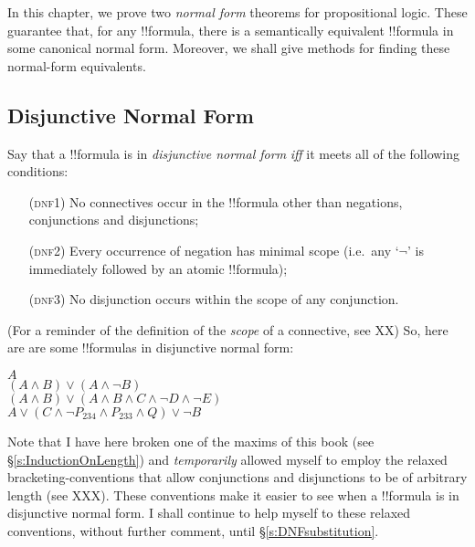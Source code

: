 \documentclass[../../../include/open-logic-section]{subfiles}
\begin{document}


\newcommand*{\intoDNF}{\texttt{IntoDNF}}
\newcommand\dual[1]{\ensuremath{\underline{#1}}} 


In this chapter, we prove two \emph{normal form} theorems for propositional logic. These guarantee that, for any !!{formula}, there is a semantically equivalent !!{formula} in some canonical normal form. Moreover, we shall give methods for finding these normal-form equivalents.

\subsection{Disjunctive Normal Form}%

Say that a !!{formula} is in \emph{disjunctive normal form} \emph{iff} it meets all of the following conditions:
	\begin{itemize}
		\item[(\textsc{dnf1})] No connectives occur in the !!{formula} other than negations, conjunctions and disjunctions;
		\item[(\textsc{dnf2})] Every occurrence of negation has minimal scope (i.e.\ any `$\lnot$' is immediately followed by an atomic !!{formula});
		\item[(\textsc{dnf3})] No disjunction occurs within the scope of any conjunction.
	\end{itemize}
(For a reminder of the definition of the \emph{scope} of a connective, see XX) So, here are are some !!{formula}s in disjunctive normal form:
	\begin{center}
		$A$\\
		$(A \land B) \lor (A \land \lnot B)$\\
		$(A \land B) \lor (A \land  B \land C \land \lnot D \land \lnot E)$\\
		$A \lor (C \land \lnot P_{234} \land P_{233} \land Q) \lor \lnot B$
	\end{center}
Note that I have here broken one of the maxims of this book (see \S\ref{s:InductionOnLength}) and \emph{temporarily} allowed myself to employ the relaxed bracketing-conventions that allow conjunctions and disjunctions to be of arbitrary length (see XXX). These conventions make it easier to see when a !!{formula} is in disjunctive normal form. I shall continue to help myself to these relaxed conventions, without further comment, until \S\ref{s:DNFsubstitution}. 
\end{document}
